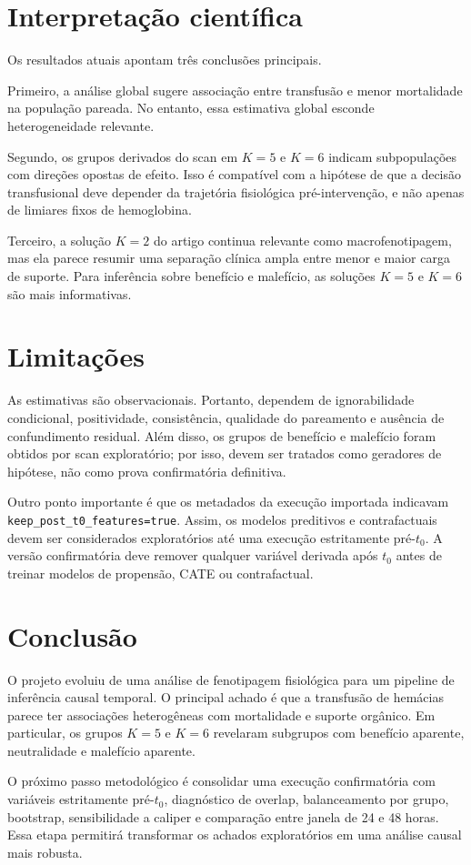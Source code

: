 \documentclass[12pt,a4paper]{article}
\begin{document}
\section{Interpreta\c{c}\~ao cient\'ifica}

Os resultados atuais apontam tr\^es conclus\~oes principais.

Primeiro, a an\'alise global sugere associa\c{c}\~ao entre transfus\~ao e menor mortalidade na popula\c{c}\~ao pareada. No entanto, essa estimativa global esconde heterogeneidade relevante.

Segundo, os grupos derivados do scan em $K=5$ e $K=6$ indicam subpopula\c{c}\~oes com dire\c{c}\~oes opostas de efeito. Isso \'e compat\'ivel com a hip\'otese de que a decis\~ao transfusional deve depender da trajet\'oria fisiol\'ogica pr\'e-interven\c{c}\~ao, e n\~ao apenas de limiares fixos de hemoglobina.

Terceiro, a solu\c{c}\~ao $K=2$ do artigo continua relevante como macrofenotipagem, mas ela parece resumir uma separa\c{c}\~ao cl\'inica ampla entre menor e maior carga de suporte. Para infer\^encia sobre benef\'icio e malef\'icio, as solu\c{c}\~oes $K=5$ e $K=6$ s\~ao mais informativas.

\section{Limita\c{c}\~oes}

As estimativas s\~ao observacionais. Portanto, dependem de ignorabilidade condicional, positividade, consist\^encia, qualidade do pareamento e aus\^encia de confundimento residual. Al\'em disso, os grupos de benef\'icio e malef\'icio foram obtidos por scan explorat\'orio; por isso, devem ser tratados como geradores de hip\'otese, n\~ao como prova confirmat\'oria definitiva.

Outro ponto importante \'e que os metadados da execu\c{c}\~ao importada indicavam \texttt{keep\_post\_t0\_features=true}. Assim, os modelos preditivos e contrafactuais devem ser considerados explorat\'orios at\'e uma execu\c{c}\~ao estritamente pr\'e-$t_0$. A vers\~ao confirmat\'oria deve remover qualquer vari\'avel derivada ap\'os $t_0$ antes de treinar modelos de propens\~ao, CATE ou contrafactual.

\section{Conclus\~ao}

O projeto evoluiu de uma an\'alise de fenotipagem fisiol\'ogica para um pipeline de infer\^encia causal temporal. O principal achado \'e que a transfus\~ao de hem\'acias parece ter associa\c{c}\~oes heterog\^eneas com mortalidade e suporte org\^anico. Em particular, os grupos $K=5$ e $K=6$ revelaram subgrupos com benef\'icio aparente, neutralidade e malef\'icio aparente.

O pr\'oximo passo metodol\'ogico \'e consolidar uma execu\c{c}\~ao confirmat\'oria com vari\'aveis estritamente pr\'e-$t_0$, diagn\'ostico de overlap, balanceamento por grupo, bootstrap, sensibilidade a caliper e compara\c{c}\~ao entre janela de 24 e 48 horas. Essa etapa permitir\'a transformar os achados explorat\'orios em uma an\'alise causal mais robusta.
\end{document}
